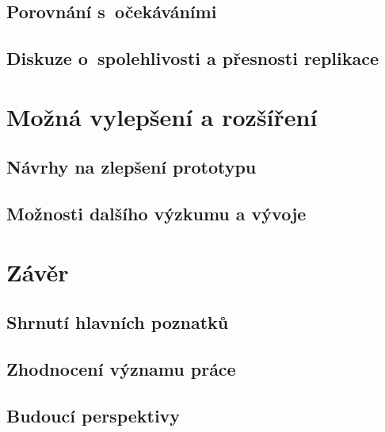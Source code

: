 \section{Porovnání s~očekáváními}
\section{Diskuze o~spolehlivosti a přesnosti replikace}

\chapter{Možná vylepšení a rozšíření}
\section{Návrhy na zlepšení prototypu}
\section{Možnosti dalšího výzkumu a vývoje}

\chapter{Závěr}
\section{Shrnutí hlavních poznatků}
\section{Zhodnocení významu práce}
\section{Budoucí perspektivy}


%
